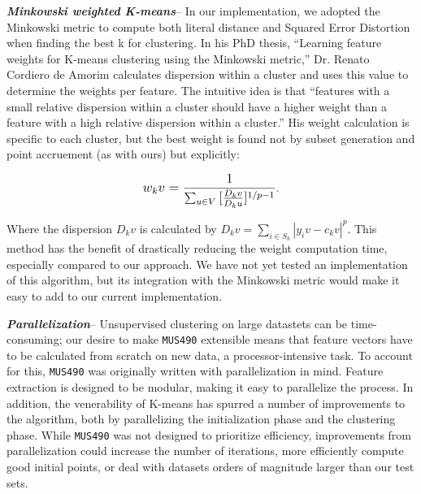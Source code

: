 \documentclass[12pt,twocolumn,titlepage]{article}
\begin{document}
\emph{\textbf{Minkowski weighted K-means}}-- In our implementation, we adopted the Minkowski metric to compute both literal distance and Squared Error Distortion when finding the best k for clustering. In his PhD thesis, ``Learning feature weights for K-means clustering using the Minkowski metric,'' Dr. Renato Cordiero de Amorim calculates dispersion within a cluster and uses this value to determine the weights per feature. The intuitive idea is that ``features with a small relative dispersion within a cluster should have a higher weight than a feature with a high relative dispersion within a cluster.'' \cite{MinkWeightedK} His weight calculation is specific to each cluster, but the best weight is found not by subset generation and point accruement (as with ours) but explicitly: 

\begin{equation}\label{}
\mathlarger{w_kv = \frac{1}{\sum_{u \in V}{}{[\frac{D_kv}{D_ku}]^{1 / p-1}}}}.
\end{equation}

Where the dispersion $D_kv$ is calculated by $D_kv = \sum_{i \in S_k}{}{|y_iv - c_kv|^p}$. This method has the benefit of drastically reducing the weight computation time, especially compared to our approach. We have not yet tested an implementation of this algorithm, but its integration with the Minkowski metric would make it easy to add to our current implementation.

\emph{\textbf{Parallelization}}-- Unsupervised clustering on large datastets can be time-consuming; our desire to make \texttt{MUS490} extensible means that feature vectors have to be calculated from scratch on new data, a processor-intensive task. To account for this, \texttt{MUS490} was originally written with parallelization in mind. Feature extraction is designed to be modular, making it easy to parallelize the process. In addition, the venerability of K-means has spurred a number of improvements to the algorithm, both by parallelizing the initialization phase \cite{KMeans++} and the clustering phase. \cite{ParallelK} While \texttt{MUS490} was not designed to prioritize efficiency, improvements from parallelization could increase the number of iterations, more efficiently compute good initial points, or deal with datasets orders of magnitude larger than our test sets.
\end{document}
